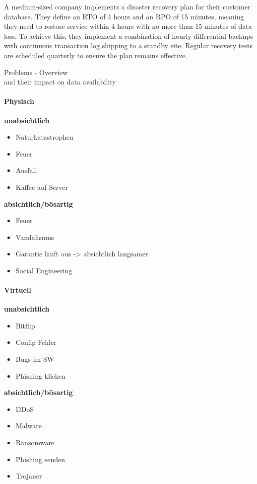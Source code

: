 \begin{example}
A medium-sized company implements a disaster recovery plan for their customer database. They define an RTO of 4 hours and an RPO of 15 minutes, meaning they need to restore service within 4 hours with no more than 15 minutes of data loss. To achieve this, they implement a combination of hourly differential backups with continuous transaction log shipping to a standby site. Regular recovery tests are scheduled quarterly to ensure the plan remains effective.
\end{example}



\begin{concept}{Problems - Overview}\\ and their impact on data availability
\paragraph{Physisch}
\textbf{unabsichtlich}
\begin{itemize}
    \item Naturkatastrophen
    \item Feuer
    \item Ausfall
    \item Kaffee auf Server
\end{itemize}

\textbf{absichtlich/bösartig}
\begin{itemize}
    \item Feuer
    \item Vandalismus
    \item Garantie läuft aus -> absichtlich langsamer
    \item Social Engineering
\end{itemize}

\paragraph{Virtuell}
\textbf{unabsichtlich}
\begin{itemize}
    \item Bitflip
    \item Config Fehler
    \item Bugs im SW
    \item Phishing klicken
\end{itemize}

\textbf{absichtlich/bösartig}
\begin{itemize}
    \item DDoS
    \item Malware
    \item Ransomware
    \item Phishing senden
    \item Trojaner
\end{itemize}
\end{concept}

